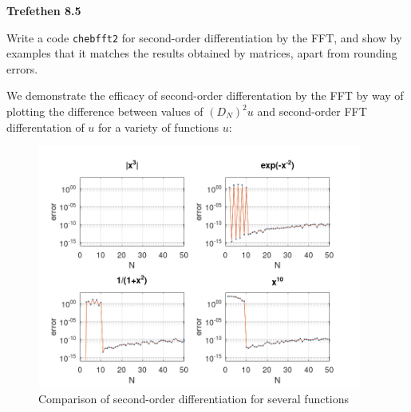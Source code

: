 \textbf{Trefethen 8.5}

Write a code \texttt{chebfft2} for second-order differentiation by the FFT, and show by examples that it matches the
results obtained by matrices, apart from rounding errors.

\begin{solution}
  We demonstrate the efficacy of second-order differentation by the FFT by way of plotting the difference between values
  of $(D_N)^2 u$ and second-order FFT differentation of $u$ for a variety of functions $u$:

  \begin{figure}[h]
    \centering
    \includegraphics*[width=0.95\textwidth]{problem_7.png}
    \caption{Comparison of second-order differentiation for several functions}\label{fig:cheb_fft2_diff}
  \end{figure}

  \ \\
  \vfill
\end{solution}